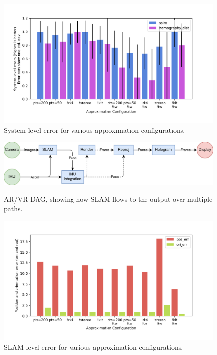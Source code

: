 \begin{figure}[H]
  \label{system-level-errors}
  \caption{System-level error for various approximation configurations.}
  \includegraphics[width=\columnwidth]{system_errors.png}
\end{figure}

\begin{figure}[H]
\caption{AR/VR DAG, showing how SLAM flows to the output over multiple paths.}
\includegraphics[width=\columnwidth]{dag.png}
\label{dag}
\end{figure}

\begin{figure}[H]
  \label{SLAM-level-errors}
  \caption{SLAM-level error for various approximation configurations.}
  \includegraphics[width=\columnwidth]{slam_errors.png}
\end{figure}

